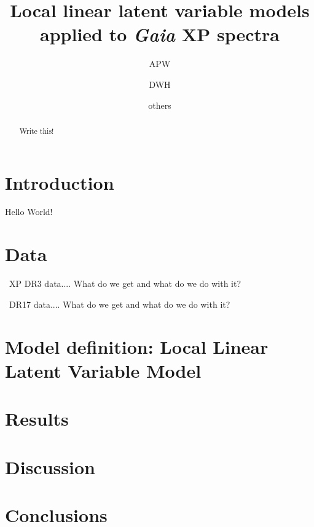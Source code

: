 \documentclass[modern]{aastex631}
\begin{document}
\title{Local linear latent variable models applied to \textsl{Gaia} XP spectra}

\author{APW}
\author{DWH}
\author{others}

\begin{abstract}\noindent %
  Write this!
\end{abstract}

\section{Introduction} \label{sec:intro}

Hello World!

\section{Data} \label{sec:data}

\Gaia\ XP DR3 data.... What do we get and what do we do with it?

\APOGEE\ DR17 data.... What do we get and what do we do with it?

\section{Model definition: Local Linear Latent Variable Model} \label{sec:model}

\section{Results} \label{sec:results}

\section{Discussion} \label{sec:discussion}

\section{Conclusions} \label{sec:conclusion}


{}

\end{document}
